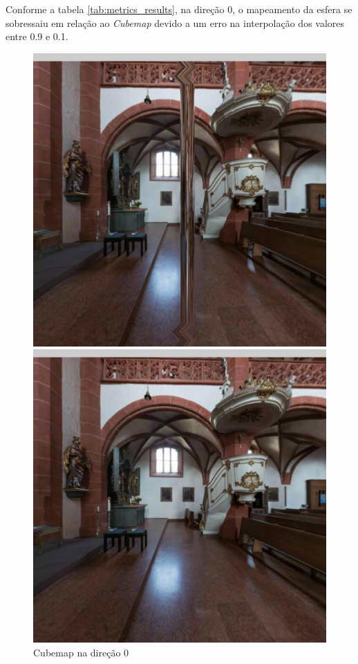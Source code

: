 \documentclass[conference]{IEEEtran}
\begin{document}
Conforme a tabela \ref{tab:metrics_results}, na direção 0, o mapeamento da esfera se sobressaiu em relação ao \textit{Cubemap} devido a um erro na interpolação dos valores entre 0.9 e 0.1.

\begin{figure}[!tbp]
  \centering
  \begin{minipage}[b]{0.3\textwidth}
    \includegraphics[width=1.1\textwidth]{../images/screenshots/Screenshot_0_Equi2Cube}
    \caption{Cubemap na direção 0}
    \label{fig:sphere_direction_0}
  \end{minipage}
  \hfill
  \begin{minipage}[b]{0.3\textwidth}
    \centering
    \includegraphics[width=1.1\textwidth]{../images/screenshots/Screenshot_0_Skybox}

\end{minipage}
\end{figure}
\end{document}
